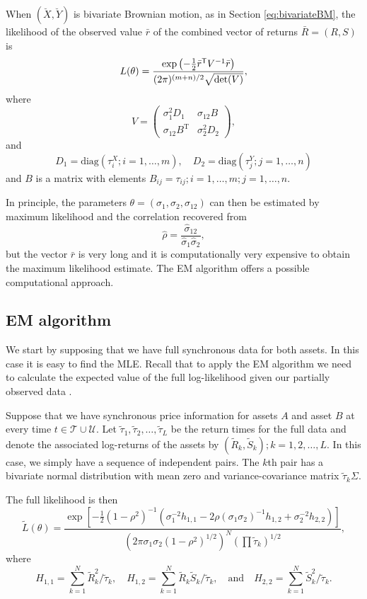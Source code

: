 When $(\breve{X},\breve{Y})$ is bivariate Brownian motion, as in Section \ref{eq:bivariateBM}, the likelihood of the observed value $\bar{r}$ of the combined vector of returns $\bar{R} = (R,S)$  is 
$$L(\theta) = \frac{\exp\left(-\frac12 \bar{r}^\text{\sf T} V^{-1} \bar{r}\right)}{(2 \pi)^{(m+n)/2}\sqrt{\text{det}(V)}},$$
where 
$$V = \left(\begin{array}{cc} \sigma^2_1 D_1& \sigma_{12} B\\ \sigma_{12} B^\text{T}&\sigma^2_2 D_2 \end{array}\right),$$
and
$$D_1 = \text{diag}(\tau_i^X; i=1,\dots,m), \quad   D_2 = \text{diag}(\tau_j^Y; j=1,\dots,n)$$ 
and $B$ is a matrix with elements $B_{ij}= \tau_{ij}; i=1,\dots,m; j=1,\dots,n $.

In principle, the parameters $\theta = (\sigma_{1},\sigma_{2},\sigma_{12})$ can then be estimated by maximum likelihood and the correlation recovered from
$$ \hat{\rho} = \frac{\hat{\sigma}_{12}}{\hat{\sigma}_1 \hat{\sigma}_2},$$
but the vector $\bar{r}$ is very long and it is computationally very expensive to obtain the maximum likelihood
estimate.
The EM algorithm offers a possible computational approach.
\subsection{EM algorithm}
We start by supposing that we have full synchronous data for both assets. In this case it is easy to find the MLE. Recall that to apply the EM algorithm we need to calculate the expected value of the full log-likelihood given our partially observed data \citep{dempster1977maximum}.

Suppose that we have synchronous price information for assets $A$ and asset $B$ at every time  $t \in  \mathcal{T} \cup \mathcal{U}$.  Let $\tilde{\tau}_1,\tilde{\tau}_2, \dots, \tilde{\tau}_L$ be the return times for the full data and denote the associated log-returns of the assets by $(\tilde{R}_k,\tilde{S}_k); k=1,2,\dots,L$.  In this case, we simply have a sequence of independent pairs. The $k$th pair has a bivariate normal distribution with mean zero and variance-covariance matrix $\tilde{\tau}_k\Sigma$.  

The full likelihood is then
$$\tilde{L}(\theta) = \frac{\exp\left[-\frac12(1-\rho^2)^{-1}\left(\sigma_{1}^{-2} h_{1,1}
 - 2 \rho (\sigma_{1} \sigma_{2})^{-1} h_{1,2} + \sigma_{2}^{-2} h_{2,2}\right)\right]}
 {(2 \pi \sigma_{1} \sigma_{2} (1-\rho^2)^{1/2})^N (\prod \tilde{\tau}_k)^{1/2}},$$
where 
$$ H_{1,1} = \sum_{k=1}^N \tilde{R}_k^2/\tilde{\tau}_k, \quad H_{1,2} = \sum_{k=1}^N \tilde{R}_k \tilde{S}_k /\tilde{\tau}_k,
 \quad \text{and}\quad H_{2,2} = \sum_{k=1}^N \tilde{S}_k^2 /\tilde{\tau}_k.$$


